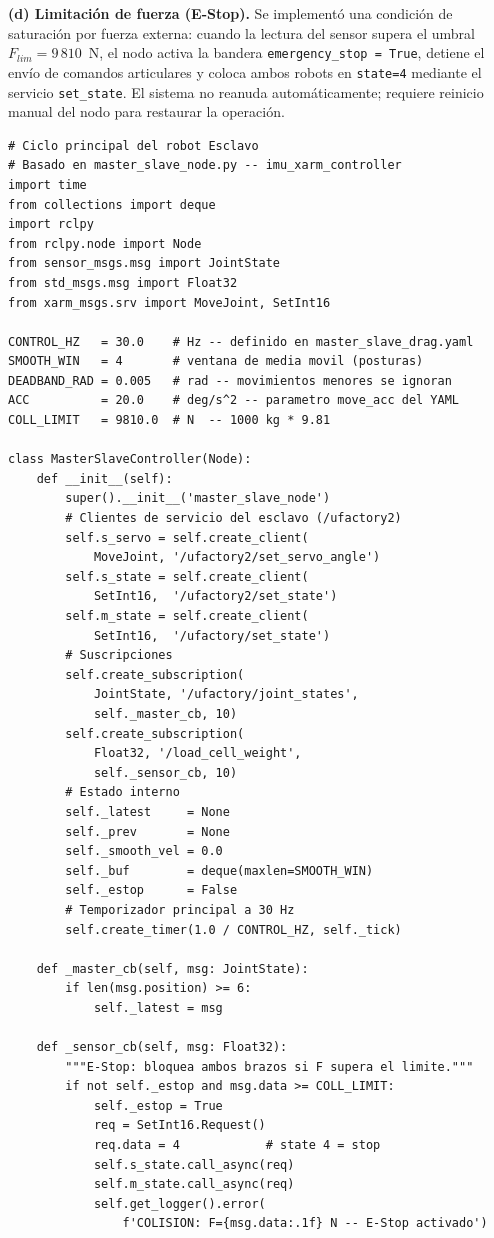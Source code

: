 \documentclass[journal,10pt,twoside]{IEEEtran}
\begin{document}
\textbf{(d) Limitación de fuerza (E-Stop).}
Se implementó una condición de saturación por fuerza externa:
cuando la lectura del sensor supera el umbral
$F_{lim}{=}9\,810$~N, el nodo activa la bandera
\texttt{emergency\_stop = True}, detiene el envío de comandos
articulares y coloca ambos robots en \texttt{state=4} mediante
el servicio \texttt{set\_state}. El sistema no reanuda
automáticamente; requiere reinicio manual del nodo para restaurar
la operación.

\begin{lstlisting}[caption={Ciclo de control del robot Esclavo -- implementacion real},
                   label={lst:slave}]
# Ciclo principal del robot Esclavo
# Basado en master_slave_node.py -- imu_xarm_controller
import time
from collections import deque
import rclpy
from rclpy.node import Node
from sensor_msgs.msg import JointState
from std_msgs.msg import Float32
from xarm_msgs.srv import MoveJoint, SetInt16

CONTROL_HZ   = 30.0    # Hz -- definido en master_slave_drag.yaml
SMOOTH_WIN   = 4       # ventana de media movil (posturas)
DEADBAND_RAD = 0.005   # rad -- movimientos menores se ignoran
ACC          = 20.0    # deg/s^2 -- parametro move_acc del YAML
COLL_LIMIT   = 9810.0  # N  -- 1000 kg * 9.81

class MasterSlaveController(Node):
    def __init__(self):
        super().__init__('master_slave_node')
        # Clientes de servicio del esclavo (/ufactory2)
        self.s_servo = self.create_client(
            MoveJoint, '/ufactory2/set_servo_angle')
        self.s_state = self.create_client(
            SetInt16,  '/ufactory2/set_state')
        self.m_state = self.create_client(
            SetInt16,  '/ufactory/set_state')
        # Suscripciones
        self.create_subscription(
            JointState, '/ufactory/joint_states',
            self._master_cb, 10)
        self.create_subscription(
            Float32, '/load_cell_weight',
            self._sensor_cb, 10)
        # Estado interno
        self._latest     = None
        self._prev       = None
        self._smooth_vel = 0.0
        self._buf        = deque(maxlen=SMOOTH_WIN)
        self._estop      = False
        # Temporizador principal a 30 Hz
        self.create_timer(1.0 / CONTROL_HZ, self._tick)

    def _master_cb(self, msg: JointState):
        if len(msg.position) >= 6:
            self._latest = msg

    def _sensor_cb(self, msg: Float32):
        """E-Stop: bloquea ambos brazos si F supera el limite."""
        if not self._estop and msg.data >= COLL_LIMIT:
            self._estop = True
            req = SetInt16.Request()
            req.data = 4            # state 4 = stop
            self.s_state.call_async(req)
            self.m_state.call_async(req)
            self.get_logger().error(
                f'COLISION: F={msg.data:.1f} N -- E-Stop activado')


\end{lstlisting}
\end{document}
